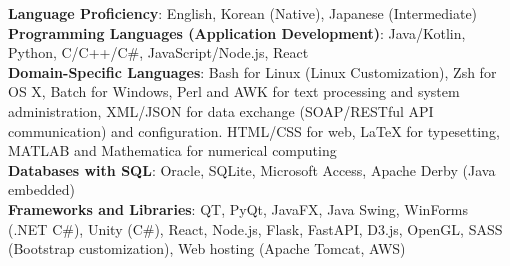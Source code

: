 \textbf{Language Proficiency}: English, Korean (Native), Japanese (Intermediate)\\
\textbf{Programming Languages (Application Development)}: Java/Kotlin, Python, C/C++/C\#, JavaScript/Node.js, React\\
\textbf{Domain-Specific Languages}: Bash for Linux (Linux Customization), Zsh for OS X, Batch for Windows, 
Perl and AWK for text processing and system administration, 
XML/JSON for data exchange (SOAP/RESTful API communication) and configuration.
HTML/CSS for web, 
LaTeX for typesetting, MATLAB and Mathematica for numerical computing\\
\textbf{Databases with SQL}: Oracle, SQLite, Microsoft Access, Apache Derby (Java embedded)\\
\textbf{Frameworks and Libraries}: 
QT, PyQt, JavaFX, Java Swing, WinForms (.NET C\#), Unity (C\#), 
React, Node.js, Flask, FastAPI, D3.js, OpenGL, 
SASS (Bootstrap customization), Web hosting (Apache Tomcat, AWS)\\
